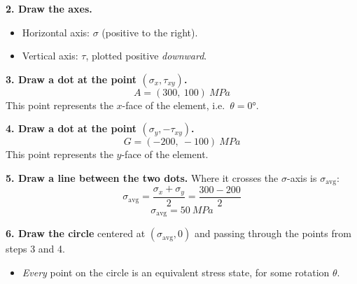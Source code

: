 \documentclass[11pt]{article}
\begin{document}
\bigskip
\noindent
\begin{minipage}[c]{0.53\textwidth}
\textbf{2. Draw the axes.}
\begin{itemize}
  \item Horizontal axis: $\sigma$ (positive to the right).
  \item Vertical axis: $\tau$, plotted positive \emph{downward}.
\end{itemize}
\end{minipage}%
\hfill
\begin{minipage}[c]{0.44\textwidth}
\centering{}
\end{minipage}

\bigskip
\noindent
\begin{minipage}[c]{0.53\textwidth}
\textbf{3. Draw a dot at the point $(\sigma_x, \tau_{xy})$.}
\[ A = (300,\ 100)\ \si{MPa} \]
This point represents the $x$-face of the element, i.e.\ $\theta = \ang{0}$.
\end{minipage}%
\hfill
\begin{minipage}[c]{0.44\textwidth}
\centering{}
\end{minipage}

\bigskip
\noindent
\begin{minipage}[c]{0.53\textwidth}
\textbf{4. Draw a dot at the point $(\sigma_y, -\tau_{xy})$.}
\[ G = (-200,\ -100)\ \si{MPa} \]
This point represents the $y$-face of the element.
\end{minipage}%
\hfill
\begin{minipage}[c]{0.44\textwidth}
\centering{}
\end{minipage}

\bigskip
\noindent
\begin{minipage}[c]{0.53\textwidth}
\textbf{5. Draw a line between the two dots.} Where it crosses the $\sigma$-axis is
$\sigma_{\text{avg}}$:
\[
  \sigma_{\text{avg}} = \frac{\sigma_x + \sigma_y}{2} = \frac{300 - 200}{2}
\]
\[ \boxed{\sigma_{\text{avg}} = \SI{50}{MPa}} \]
\end{minipage}%
\hfill
\begin{minipage}[c]{0.44\textwidth}
\centering{}
\end{minipage}

\bigskip
\noindent
\begin{minipage}[c]{0.53\textwidth}
\textbf{6. Draw the circle} centered at $(\sigma_{\text{avg}}, 0)$ and passing through the
points from steps 3 and 4.
\begin{itemize}[label=\then]
  \item \emph{Every} point on the circle is an equivalent stress state, for some rotation
        $\theta$.
\end{itemize}
\end{minipage}%
\hfill
\begin{minipage}[c]{0.44\textwidth}
\centering{}
\end{minipage}
\end{document}
